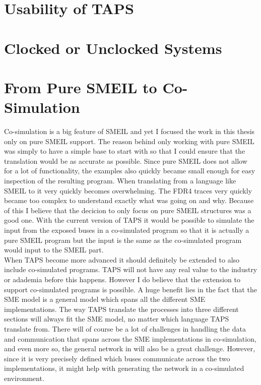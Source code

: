 
\section{Usability of TAPS}


\section{Clocked or Unclocked \cspm{} Systems}


\section{From Pure SMEIL to Co-Simulation}
Co-simulation is a big feature of SMEIL and yet I focused the work in this thesis only on pure SMEIL support. The reason behind only working with pure SMEIL was simply to have a simple base to start with so that I could ensure that the translation would be as accurate as possible. Since pure SMEIL does not allow for a lot of functionality, the examples also quickly became small enough for easy inspection of the resulting \cspm{} program. When translating from a language like SMEIL to \cspm{} it very quickly becomes overwhelming. The FDR4 traces very quickly became too complex to understand exactly what was going on and why. Because of this I believe that the decicion to only focus on pure SMEIL structures was a good one.
With the current version of TAPS it would be possible to simulate the input from the exposed buses in a co-simulated program so that it is actually a pure SMEIL program but the input is the same as the co-simulated program would input to the SMEIL part.\\

When TAPS become more advanced it should definitely be extended to also include co-simulated programs. TAPS will not have any real value to the industry or adademia before this happens. However I do believe that the extension to support co-simulated programs is possible. A huge benefit lies in the fact that the SME model is a general model which spans all the different SME implementations. The way TAPS translate the processes into three different sections will always fit the SME model, no matter which language TAPS translate from.
There will of course be a lot of challenges in handling the data and communication that spans across the SME implementations in co-simulation, and even more so, the general network in \cspm{} will also be a great challenge. However, since it is very precisely defined which buses communicate across the two implementations, it might help with generating the \cspm{} network in a co-simulated environment.\\


